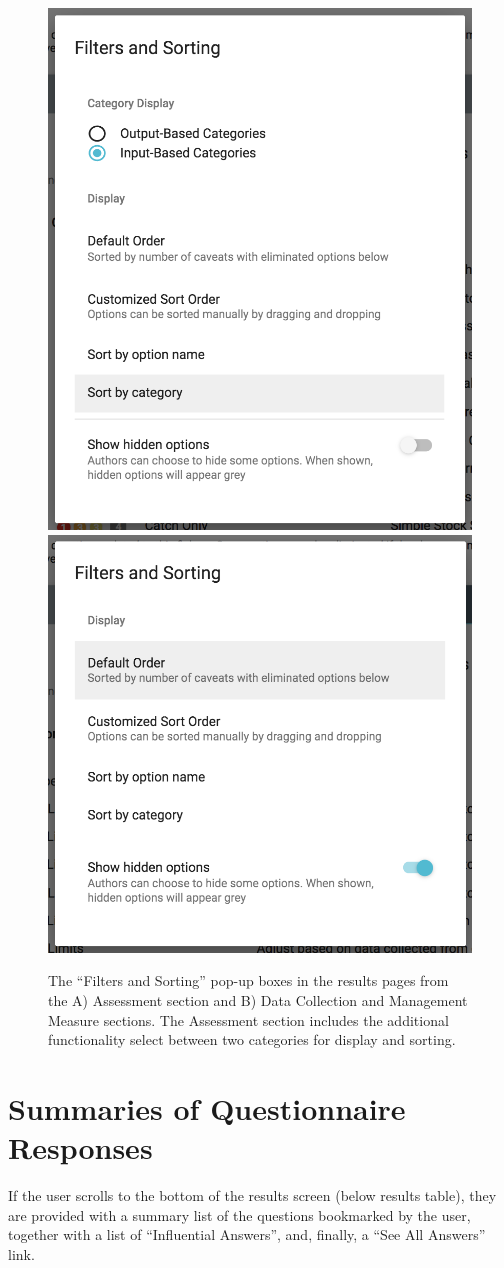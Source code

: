\documentclass[11pt,]{book}
\begin{document}
\begin{figure}

{\centering \includegraphics[width=0.5\linewidth]{images/filter-and-sorting-assessment} \includegraphics[width=0.5\linewidth]{images/filter-and-sorting} 

}

\caption{The “Filters and Sorting” pop-up boxes in the results pages from the A) Assessment section and B) Data Collection and Management Measure sections. The Assessment section includes the additional functionality select between two categories for display and sorting.}\label{fig:filter-and-sorting}
\end{figure}

\hypertarget{summaries-of-questionnaire-responses}{%
\section{Summaries of Questionnaire
Responses}\label{summaries-of-questionnaire-responses}}

If the user scrolls to the bottom of the results screen (below results
table), they are provided with a summary list of the questions
bookmarked by the user, together with a list of ``Influential Answers'',
and, finally, a ``See All Answers'' link.
\end{document}
